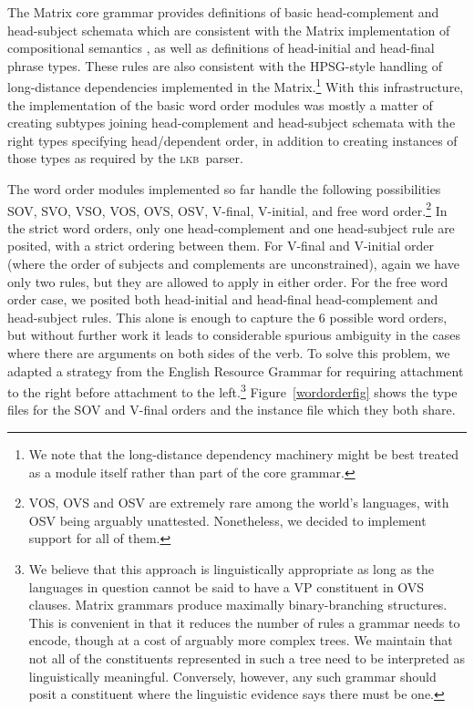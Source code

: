 \documentclass[11pt]{article}
\newcommand{\lkb}{\textsc{lkb}}
\begin{document}
The Matrix core grammar provides definitions of basic
head-complement and head-subject schemata which are consistent with
the Matrix implementation of compositional semantics
\cite{Fli:Ben:03}, as well as definitions of head-initial and
head-final phrase types.  These rules are also consistent with the
HPSG-style handling of long-distance dependencies implemented in the
Matrix.\footnote{We note that the long-distance dependency machinery
might be best treated as a module itself rather than part of the core
grammar.}  With this infrastructure, the implementation of the basic
word order modules was mostly a matter of creating subtypes joining
head-complement and head-subject schemata with the right types
specifying head/dependent order, in addition to creating instances of
those types as required by the \lkb\ parser.

The word order modules implemented so far handle the following
possibilities SOV, SVO, VSO, VOS, OVS, OSV, V-final, V-initial, and
free word order.\footnote{VOS, OVS and OSV are extremely rare among
the world's languages, with OSV being arguably unattested.
Nonetheless, we decided to implement support for all of them.}  In the
strict word orders, only one head-complement and one head-subject rule
are posited, with a strict ordering between them.  For V-final and
V-initial order (where the order of subjects and complements are
unconstrained), again we have only two rules, but they are allowed to
apply in either order.  For the free word order case, we posited both
head-initial and head-final head-complement and head-subject rules.
This alone is enough to capture the 6 possible word orders, but
without further work it leads to considerable spurious ambiguity in
the cases where there are arguments on both sides of the verb.  To
solve this problem, we adapted a strategy from the English Resource
Grammar for requiring attachment to the right before attachment to the
left.\footnote{We believe that this approach is linguistically
appropriate as long as the languages in question cannot be said to
have a VP constituent in OVS clauses.  Matrix grammars produce
maximally binary-branching structures.  This is convenient in that it
reduces the number of rules a grammar needs to encode, though at a
cost of arguably more complex trees.  We maintain that not all of the
constituents represented in such a tree need to be interpreted as
linguistically meaningful.  Conversely, however, any such grammar
should posit a constituent where the linguistic evidence says there
must be one.}
Figure~\ref{wordorderfig} shows the type files for the SOV and
V-final orders and the instance file which they both share.
\end{document}
